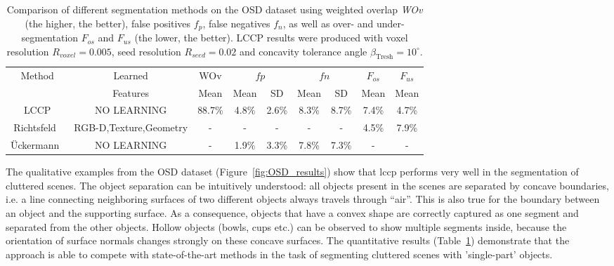  \begin{table}[!ht]
   \small
   \centering
    \begin{tabular}{c||c||c||cc||cc||c||c}
    \multirow{2}{*}{Method} & Learned & WOv     & \multicolumn{2}{c||}{$fp$} & \multicolumn{2}{c||}{$fn$} & $F_{os}$ & $F_{us}$ \\ \cline{3-9}
    ~                       & Features & Mean   & Mean  & SD     & Mean  & SD    & Mean   & Mean   \\ \hline\hline
    LCCP            &  NO LEARNING & 88.7\% &  4.8\% & 2.6\%  & 8.3\% & 8.7\% & 7.4\%  & 4.7\%  \\ \hline
    Richtsfeld~\cite{Richtsfeld:IROS12}  & RGB-D,Texture,Geometry & -      & -          & -      & -     & -     & 4.5\%  & 7.9\%  \\ \hline
    {\"U}ckermann~\cite{Ritter2012} & NO LEARNING & -      & 1.9\% & 3.3\%  & 7.8\% & 7.3\% & -      & -      \\ \hline
    \end{tabular}
    \caption[Segmentation Results on OSD Dataset]{Comparison of different segmentation methods on the OSD dataset using weighted overlap \textit{WOv} (the higher, the better), false positives \textit{$f_p$}, false negatives \textit{$f_n$}, as well as over- and under-segmentation \textit{$F_{os}$} and \textit{$F_{us}$} (the lower, the better). LCCP results were produced with voxel resolution $R_{voxel} = 0.005$, seed resolution $R_{seed} = 0.02$ and concavity tolerance angle $\beta_\text{Tresh}=10^\circ$.}
    \label{tab:res_stat}
\end{table}

The qualitative examples from the OSD dataset (Figure~\ref{fig:OSD_results}) show that \gls{lccp} performs very well in the segmentation of cluttered scenes. The object separation can be intuitively understood: all objects present in the scenes are separated by concave boundaries, i.e. a line connecting neighboring surfaces of two different objects always travels through ``air''. This is also true for the boundary between an object and the supporting surface. As a consequence, objects that have a convex shape are correctly captured as one segment and separated from the other objects. Hollow objects (bowls, cups etc.) can be observed to show multiple segments inside, because the orientation of surface normals changes strongly on these concave surfaces. The quantitative results (Table~\ref{tab:res_stat}) demonstrate that the approach is able to compete with state-of-the-art methods in the task of segmenting cluttered scenes with 'single-part' objects. 


